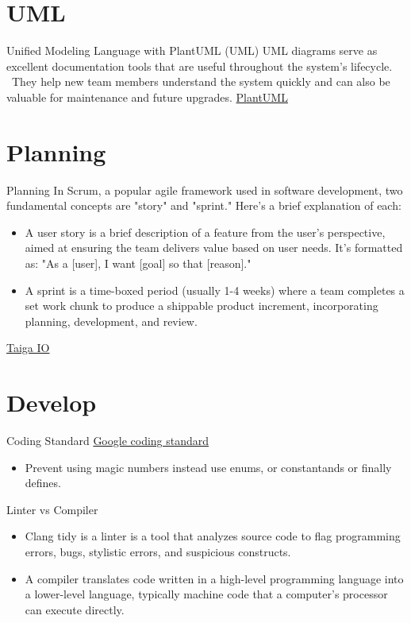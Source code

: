 \documentclass[10pt]{beamer}
\begin{document}
\section{UML}
\begin{frame} {Unified Modeling Language with PlantUML (UML)}
  UML diagrams serve as excellent documentation tools that are useful throughout the system's lifecycle. \
  They help new team members understand the system quickly and can also be valuable for maintenance and future upgrades.
  \href{https://plantuml.com/}{PlantUML}
\end{frame}

\section{Planning}
\begin{frame} {Planning}
  In Scrum, a popular agile framework used in software development, two fundamental concepts are "story" and "sprint." Here's a brief explanation of each:
  \begin{itemize}
    \item A user story is a brief description of a feature from the user's perspective, aimed at ensuring the team delivers value based on user needs. It’s formatted as: "As a [user], I want [goal] so that [reason]."
    \item A sprint is a time-boxed period (usually 1-4 weeks) where a team completes a set work chunk to produce a shippable product increment, incorporating planning, development, and review.
  \end{itemize}

  \href{Taiga.io}{Taiga IO}
\end{frame}

\section{Develop}

\begin{frame} {Coding Standard}
  \href{https://google.github.io/styleguide/cppguide.html}{Google coding standard}
  \begin{itemize}
    \item Prevent using magic numbers instead use enums, or constantands or finally defines.
  \end{itemize}
\end{frame}

\begin{frame} {Linter vs Compiler}
  \begin{itemize}
    \item Clang tidy is a linter is a tool that analyzes source code to flag programming errors, bugs, stylistic errors, and suspicious constructs.
    \item A compiler translates code written in a high-level programming language into a lower-level language, typically machine code that a computer's processor can execute directly.
  \end{itemize}
\end{frame}
\end{document}
